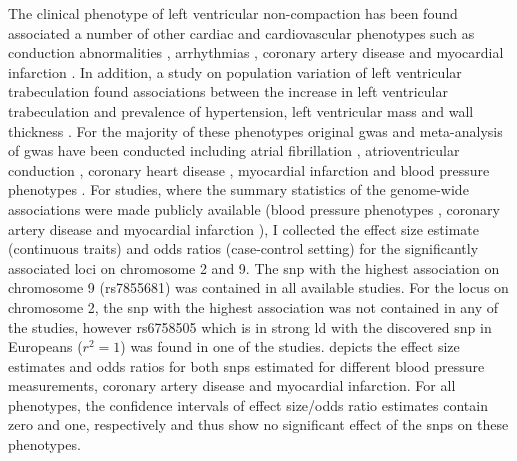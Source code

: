 The clinical phenotype of left ventricular non-compaction has been found associated a number of other cardiac and cardiovascular phenotypes such as conduction abnormalities \citep{Yousef2009}, arrhythmias \citep{Ritter1997,Oechslin2000,Yousef2009}, coronary artery disease \citep{Ritter1997,Junga1999,Jenni2002,Soler2002} and myocardial infarction \citep{Swinkels2007,Toufan2012,Guvens2012}. In addition, a study on population variation of left ventricular trabeculation found associations between the increase in left ventricular trabeculation and prevalence of hypertension, left ventricular mass and wall thickness \citep{Captur2015}. For the majority of these phenotypes original \gls{gwas} and meta-analysis of \gls{gwas} have been conducted including atrial fibrillation \citep{Gudbjartsson2007,Christophersen2017}, atrioventricular conduction \citep{Denny2010}, coronary heart disease \citep{Schunkert2011,Lee2013a,Nikpay2015}, myocardial infarction \citep{Kathiresan2009,Hirokawa2015,Nikpay2015,Dehghan2016} and blood pressure phenotypes \citep{Ehret2011,Wain2011}. For studies, where the summary statistics of the genome-wide associations were made publicly available (blood pressure phenotypes \citep{Ehret2011,Wain2011}, coronary artery disease \citep{Schunkert2011} and myocardial infarction \citep{Nikpay2015}), I collected the effect size estimate (continuous traits) and odds ratios (case-control setting) for the significantly associated loci on chromosome 2 and 9. The \gls{snp} with the highest association on chromosome 9 (rs7855681) was contained in all available studies. For the locus on chromosome 2, the \gls{snp} with the highest association was not contained in any of the studies, however rs6758505 which is in strong \gls{ld} with the discovered \gls{snp} in Europeans (\(r^2=1\)) was found in one of the studies.  depicts the effect size estimates and odds ratios for both \glspl{snp}  estimated for different blood pressure measurements, coronary artery disease and myocardial infarction. For all phenotypes, the confidence intervals of effect size/odds ratio estimates contain zero and one, respectively and thus show no significant effect of the \glspl{snp}  on these phenotypes. 
%
